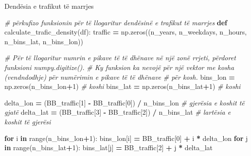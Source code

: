 \documentclass[
  ignorenonframetext,
]{beamer}
\newenvironment{Shaded}{\begin{snugshade}}{\end{snugshade}}
\newcommand{\BuiltInTok}[1]{#1}
\newcommand{\CommentTok}[1]{\textcolor[rgb]{0.56,0.35,0.01}{\textit{#1}}}
\newcommand{\ControlFlowTok}[1]{\textcolor[rgb]{0.13,0.29,0.53}{\textbf{#1}}}
\newcommand{\DecValTok}[1]{\textcolor[rgb]{0.00,0.00,0.81}{#1}}
\newcommand{\KeywordTok}[1]{\textcolor[rgb]{0.13,0.29,0.53}{\textbf{#1}}}
\newcommand{\NormalTok}[1]{#1}
\newcommand{\OperatorTok}[1]{\textcolor[rgb]{0.81,0.36,0.00}{\textbf{#1}}}
\begin{document}
\begin{frame}[fragile]{Dendësia e trafikut të marrjes}
\protect\hypertarget{denduxebsia-e-trafikut-tuxeb-marrjes-3}{}

\begin{Shaded}
\begin{Highlighting}[]
\CommentTok{\# përkufizo funksionin për të llogaritur dendësinë e trafikut të marrjes}
\KeywordTok{def}\NormalTok{ calculate\_trafic\_density(df):}
\NormalTok{    traffic }\OperatorTok{=}\NormalTok{ np.zeros((n\_years, n\_weekdays, n\_hours, n\_bins\_lat, n\_bins\_lon))}
    
    \CommentTok{\# Për të llogaritur numrin e pikave të të dhënave në një zonë rrjeti, përdoret funksioni numpy.digitize().}
    \CommentTok{\# Ky funksion ka nevojë për një vektor me kosha (vendndodhje) për numërimin e pikave të të dhënave}
    \CommentTok{\# për kosh.}
\NormalTok{    bins\_lon }\OperatorTok{=}\NormalTok{ np.zeros(n\_bins\_lon}\OperatorTok{+}\DecValTok{1}\NormalTok{)  }\CommentTok{\# koshi}
\NormalTok{    bins\_lat }\OperatorTok{=}\NormalTok{ np.zeros(n\_bins\_lat}\OperatorTok{+}\DecValTok{1}\NormalTok{)  }\CommentTok{\# koshi}
    
\NormalTok{    delta\_lon }\OperatorTok{=}\NormalTok{ (BB\_traffic[}\DecValTok{1}\NormalTok{] }\OperatorTok{{-}}\NormalTok{ BB\_traffic[}\DecValTok{0}\NormalTok{]) }\OperatorTok{/}\NormalTok{ n\_bins\_lon  }\CommentTok{\# gjerësia e koshit të gjatë}
\NormalTok{    delta\_lat }\OperatorTok{=}\NormalTok{ (BB\_traffic[}\DecValTok{3}\NormalTok{] }\OperatorTok{{-}}\NormalTok{ BB\_traffic[}\DecValTok{2}\NormalTok{]) }\OperatorTok{/}\NormalTok{ n\_bins\_lat  }\CommentTok{\# lartësia e koshit të gjerësi}
    
    \ControlFlowTok{for}\NormalTok{ i }\KeywordTok{in} \BuiltInTok{range}\NormalTok{(n\_bins\_lon}\OperatorTok{+}\DecValTok{1}\NormalTok{):}
\NormalTok{        bins\_lon[i] }\OperatorTok{=}\NormalTok{ BB\_traffic[}\DecValTok{0}\NormalTok{] }\OperatorTok{+}\NormalTok{ i }\OperatorTok{*}\NormalTok{ delta\_lon}
    \ControlFlowTok{for}\NormalTok{ j }\KeywordTok{in} \BuiltInTok{range}\NormalTok{(n\_bins\_lat}\OperatorTok{+}\DecValTok{1}\NormalTok{):}
\NormalTok{        bins\_lat[j] }\OperatorTok{=}\NormalTok{ BB\_traffic[}\DecValTok{2}\NormalTok{] }\OperatorTok{+}\NormalTok{ j }\OperatorTok{*}\NormalTok{ delta\_lat}
\end{Highlighting}
\end{Shaded}
\end{frame}
\end{document}
